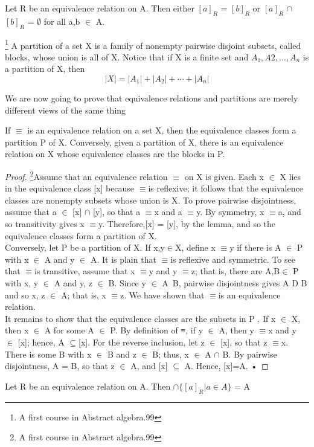 \documentclass[cn,10pt,math=newtx,citestyle=gb7714-2015,bibstyle=gb7714-2015]{elegantbook}
\begin{document}
\begin{definition}
     Let R be an equivalence relation on A. Then 
either $[a]_R$ = $[b]_R$ or $[a]_R$ $\cap$ $[b]_R$ = $\emptyset$ for all a,b $\in$ A.
\end{definition}
\begin{note}
   \footnote{A first course in Abstract algebra.99} A partition of a set X is a family of nonempty pairwise disjoint subsets,
called blocks, whose union is all of X.
Notice that if X is a finite set and $A_1,A2,\dots,A_n$ is a partition of X, then
\begin{equation*}
    |X|=|A_1|+|A_2|+\cdots+|A_n|
\end{equation*}
\end{note}
We are now going to prove that equivalence relations and partitions are
merely different views of the same thing
\begin{proposition}
    If $\equiv$ is an equivalence relation on a set X, then the equivalence classes form a partition P of X. Conversely, given a partition of X, there
is an equivalence relation on X whose equivalence classes are the blocks in P.
\end{proposition}
\begin{proof}
    \footnote{A first course in Abstract algebra.99}Assume that an equivalence relation $\equiv$ on X is given. Each x $\in$ X lies
in the equivalence class [x] because $\equiv$is reflexive; it follows that the equivalence
classes are nonempty subsets whose union is X. To prove pairwise disjointness,
assume that a $\in$ [x] $\cap$ [y], so that a $\equiv$x and a $\equiv$y. By symmetry, x $\equiv$a,
and so transitivity gives x $\equiv$y. Therefore,[x] = [y], by the lemma, and so the equivalence classes form a partition of X.
\\
Conversely, let P be a partition of X. If x,y$\in$X, define x $\equiv$y if there is
A $\in$ P with x $\in$ A and y $\in$ A. It is plain that $\equiv$is reflexive and symmetric. To
see that $\equiv$is transitive, assume that x $\equiv$y and y $\equiv$z; that is, there are A,B$\in$ P
with x, y $\in$ A and y, z $\in$ B. Since y $\in$ A\ B, pairwise disjointness gives A D B
and so x, z $\in$ A; that is, x $\equiv$z. We have shown that $\equiv$is an equivalence relation.
\\
It remains to show that the equivalence classes are the subsets in P . If x $\in$ X,
then x $\in$ A for some A $\in$ P. By definition of ≡, if y $\in$ A, then y $\equiv$x
and y $\in$ [x]; hence, A $\subseteq$[x]. For the reverse inclusion, let z $\in$ [x], so that
z $\equiv$x. There is some B with x $\in$ B and z $\in$ B; thus, x $\in$ A $\cap$ B. By pairwise
disjointness, A = B, so that z $\in$ A, and [x] $\subseteq$ A. Hence, [x]=A. •
\end{proof}
\begin{definition}
     Let R be an equivalence relation on A. Then $\cap$$\{ [a]_R| a $$\in A \}$ = A
\end{definition}
\end{document}

